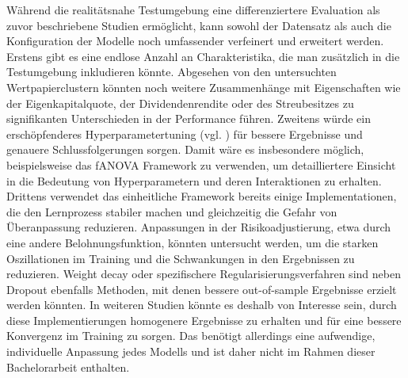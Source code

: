 Während die realitätsnahe Testumgebung eine differenziertere Evaluation als zuvor beschriebene Studien ermöglicht, kann sowohl der Datensatz als auch die Konfiguration der Modelle noch umfassender verfeinert und erweitert werden.
Erstens gibt es eine endlose Anzahl an Charakteristika, die man zusätzlich in die Testumgebung inkludieren könnte. Abgesehen von den untersuchten Wertpapierclustern könnten noch weitere Zusammenhänge mit Eigenschaften wie der Eigenkapitalquote, der Dividendenrendite oder des Streubesitzes zu signifikanten Unterschieden in der Performance führen.
Zweitens würde ein erschöpfenderes Hyperparametertuning (vgl. \parencites{snoek2012practical,bergstra2012random}) für bessere Ergebnisse und genauere Schlussfolgerungen sorgen. Damit wäre es insbesondere möglich, beispielsweise das fANOVA Framework \parencite{pmlr-v32-hutter14} zu verwenden, um detailliertere Einsicht in die Bedeutung von Hyperparametern und deren Interaktionen zu erhalten.
Drittens verwendet das einheitliche Framework bereits einige Implementationen, die den Lernprozess stabiler machen und gleichzeitig die Gefahr von Überanpassung reduzieren. Anpassungen in der Risikoadjustierung, etwa durch eine andere Belohnungsfunktion, könnten untersucht werden, um die starken Oszillationen im Training und die Schwankungen in den Ergebnissen zu reduzieren. Weight decay \parencite{ying2019overview} oder spezifischere Regularisierungsverfahren \parencites{zaremba2015recurrent} sind neben Dropout ebenfalls Methoden, mit denen bessere out-of-sample Ergebnisse erzielt werden könnten.
In weiteren Studien könnte es deshalb von Interesse sein, durch diese Implementierungen homogenere Ergebnisse zu erhalten und für eine bessere Konvergenz im Training zu sorgen. Das benötigt allerdings eine aufwendige, individuelle Anpassung jedes Modells und ist daher nicht im Rahmen dieser Bachelorarbeit enthalten.













